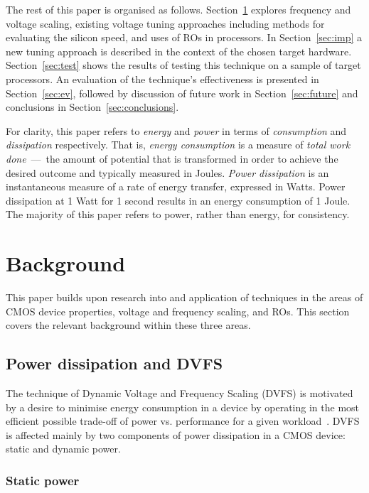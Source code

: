\documentclass[a4paper,twocolumn,DIV=16]{scrartcl}
\begin{document}
The rest of this paper is organised as follows.  Section~\ref{sec:bg} explores
frequency and voltage scaling, existing voltage tuning approaches including
methods for evaluating the silicon speed, and uses of ROs in processors. In
Section~\ref{sec:imp} a new tuning approach is described in the context of the
chosen target hardware. Section~\ref{sec:test} shows the results of testing this
technique on a sample of target processors.  An evaluation of the
technique's effectiveness is presented in Section~\ref{sec:ev}, followed by
discussion of future work in Section~\ref{sec:future} and conclusions in
Section~\ref{sec:conclusions}.

For clarity, this paper refers to \emph{energy} and \emph{power} in terms of
\emph{consumption} and \emph{dissipation} respectively. That is, \emph{energy
consumption} is a measure of \emph{total work done}~---~the amount of
potential that is transformed in order to achieve the desired outcome and
typically measured in Joules. \emph{Power dissipation} is an instantaneous
measure of a rate of energy transfer, expressed in Watts. Power dissipation at
1 Watt for 1 second results in an energy consumption of 1 Joule. The majority of
this paper refers to power, rather than energy, for consistency.

\section{Background}
\label{sec:bg}

This paper builds upon research into and application of techniques in the areas
of CMOS device properties, voltage and frequency scaling, and ROs.
This section covers the relevant background within these three areas.

\subsection{Power dissipation and DVFS}

The technique of Dynamic Voltage and Frequency Scaling (DVFS) is motivated by a
desire to minimise energy consumption in a device by operating in the most
efficient possible trade-off of power vs. performance for a given
workload~\cite{burd2000scaled}. DVFS is affected mainly by two components of
power dissipation in a CMOS device: static and dynamic power.

\subsubsection*{Static power}
\end{document}
